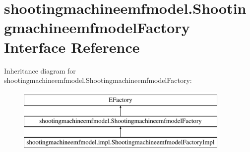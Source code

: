 \hypertarget{interfaceshootingmachineemfmodel_1_1_shootingmachineemfmodel_factory}{\section{shootingmachineemfmodel.\-Shootingmachineemfmodel\-Factory Interface Reference}
\label{interfaceshootingmachineemfmodel_1_1_shootingmachineemfmodel_factory}
}
Inheritance diagram for shootingmachineemfmodel.\-Shootingmachineemfmodel\-Factory\-:\begin{figure}[H]
\begin{center}
\leavevmode
\includegraphics[height=3.000000cm]{interfaceshootingmachineemfmodel_1_1_shootingmachineemfmodel_factory}
\end{center}
\end{figure}
